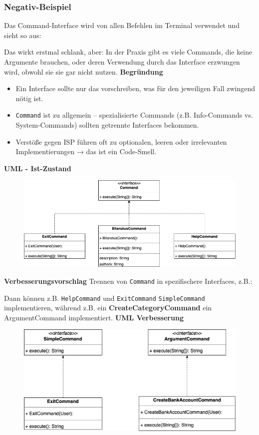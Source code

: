 \subsubsection*{Negativ-Beispiel}
Das Command-Interface wird von allen Befehlen im Terminal verwendet und sieht so aus:

Das wirkt erstmal schlank, aber: In der Praxis gibt es viele Commands, die keine Argumente brauchen, oder deren Verwendung durch das Interface erzwungen wird, obwohl sie sie gar nicht nutzen.
\textbf{Begründung}
\begin{itemize}
    \item Ein Interface sollte nur das vorschreiben, was für den jeweiligen Fall zwingend nötig ist.
    \item \texttt{Command} ist zu allgemein – spezialisierte Commands (z.B. Info-Commands vs. System-Commands) sollten getrennte Interfaces bekommen.
    \item Verstöße gegen ISP führen oft zu optionalen, leeren oder irrelevanten Implementierungen → das ist ein Code-Smell.
\end{itemize}
\textbf{UML - Ist-Zustand}\newline
\begin{figure}[htbp]
    \centering
    \includegraphics[width=\linewidth]{kapitel3_solid/ISP_negative_Command.drawio.png}
\end{figure}
\newline
\textbf{Verbesserungsvorschlag}\newline
Trennen von \texttt{Command} in spezifischere Interfaces, z.B.:

Dann können z.B. \texttt{HelpCommand} und \texttt{ExitCommand} \texttt{SimpleCommand} implementieren, während z.B. ein \textbf{CreateCategoryCommand} ein ArgumentCommand implementiert.\newline\newline
\textbf{UML Verbesserung}
\begin{figure}[htbp]
    \centering
    \includegraphics[width=\linewidth]{kapitel3_solid/ISP_negative_BetterCommand.drawio.png}
\end{figure}